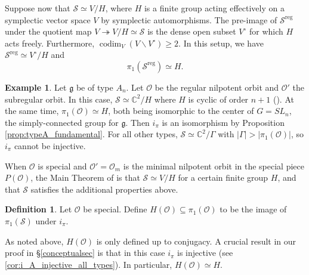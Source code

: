 \documentclass{amsart}
\theoremstyle{definition}
\newtheorem{definition}[theorem]{Definition}
\newtheorem{example}[theorem]{Example}
\DeclareMathOperator{\codim}{codim}
\DeclareMathOperator{\reg}{reg}
\newcommand{\C}{\mathbb{C}}
\newcommand{\cS}{\mathcal{S}}
\newcommand{\g}{\mathfrak{g}}
\newcommand{\0}{\mathcal{O}}
\begin{document}
Suppose now that $\cS \simeq V / H$, where $H$ is a finite group acting effectively on a symplectic vector space $V$ by symplectic automorphisms.
The pre-image of $\cS^{\reg}$ under the quotient map $V \twoheadrightarrow V/H \simeq \cS$ is the dense open subset $V^\circ$ for which $H$ acts freely.
Furthermore, $\codim_V(V \backslash V^\circ) \geq 2$. 
In this setup, we have $\cS^{\reg} \simeq V^\circ / H$ and 
$$\pi_1(\cS^{\reg}) \simeq H.$$

\begin{example}\label{example:typeA_fundamental}
    Let $\g$ be of type $A_n$.  Let $\0$ be the regular nilpotent orbit and $\0'$ the subregular orbit.  In this case, $\cS \simeq \C^2/H$ where $H$ is cyclic of order $n+1$ (\cite{Slodowy:book}).  At the same time, $\pi_1(\0) \simeq H$,
    both being isomorphic to the center of $G=SL_n$, the simply-connected group for $\g$. 
    Then $i_{\pi}$ is an isomorphism by Proposition \ref{prop:typeA_fundamental}.
    For all other types, $\cS \simeq \C^2/\Gamma$ with $|\Gamma| > |\pi_1(\0)|$, so $i_\pi$ cannot be injective. 
\end{example}


When $\0$ is special and $\0'=\0_m$  is the minimal nilpotent orbit in the special piece $P(\0)$, 
the Main Theorem of \cite{FJLS23} is that $\cS \simeq V/H$ for a 
certain finite group $H$, and that $\cS$ satisfies the additional properties above.

\begin{definition}
    Let $\0$ be special.  Define $H(\0) \subseteq \pi_1(\0)$ to be the image of $\pi_1(\cS)$ under $i_\pi$. 
\end{definition}

As noted above, $H(\0)$ is only defined up to conjugacy.  A crucial result in our proof in \S\ref{conceptualsec} is that in this case $i_\pi$ is injective (see \cref{cor:i_A_injective_all_types}).  
In particular, $H(\0) \simeq H$.



\end{document}
